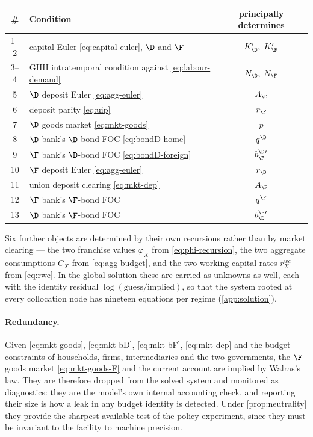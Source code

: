 \begin{center}
\begin{tabular}{clc}
\hline
\# & Condition & principally determines\\
\hline
1--2   & capital Euler \eqref{eq:capital-euler}, $\D$ and $\F$ & $K'_\D,\;K'_\F$\\
3--4   & GHH intratemporal condition against \eqref{eq:labour-demand} & $N_\D,\;N_\F$\\
5      & $\D$ deposit Euler \eqref{eq:agg-euler} & $A_\D$\\
6      & deposit parity \eqref{eq:uip} & $r_\F$\\
7      & $\D$ goods market \eqref{eq:mkt-goods} & $p$\\
8      & $\D$ bank's $\D$-bond FOC \eqref{eq:bondD-home} & $q^{\D}$\\
9      & $\F$ bank's $\D$-bond FOC \eqref{eq:bondD-foreign} & $b^{\D}_{\F}{}'$\\
10     & $\F$ deposit Euler \eqref{eq:agg-euler} & $r_\D$\\
11     & union deposit clearing \eqref{eq:mkt-dep} & $A_\F$\\
12     & $\F$ bank's $\F$-bond FOC & $q^{\F}$\\
13     & $\D$ bank's $\F$-bond FOC & $b^{\F}_{\D}{}'$\\
\hline
\end{tabular}
\end{center}

Six further objects are determined by their own recursions rather than by market
clearing --- the two franchise values $\varphi_X$ from \eqref{eq:phi-recursion},
the two aggregate consumptions $C_X$ from \eqref{eq:agg-budget}, and the two
working-capital rates $r^{wc}_X$ from \eqref{eq:rwc}. In the global solution these
are carried as unknowns as well, each with the identity residual
$\log(\text{guess}/\text{implied})$, so that the system rooted at every
collocation node has nineteen equations per regime
(\cref{app:solution}).

\paragraph{Redundancy.} Given \eqref{eq:mkt-goods}, \eqref{eq:mkt-bD},
\eqref{eq:mkt-bF}, \eqref{eq:mkt-dep} and the budget constraints of households,
firms, intermediaries and the two governments, the $\F$ goods market
\eqref{eq:mkt-goods-F} and the current account are implied by Walras's law. They
are therefore dropped from the solved system and monitored as diagnostics: they
are the model's own internal accounting check, and reporting their size is how a
leak in any budget identity is detected. Under \cref{prop:neutrality} they
provide the sharpest available test of the policy experiment, since they must be
invariant to the facility to machine precision.

